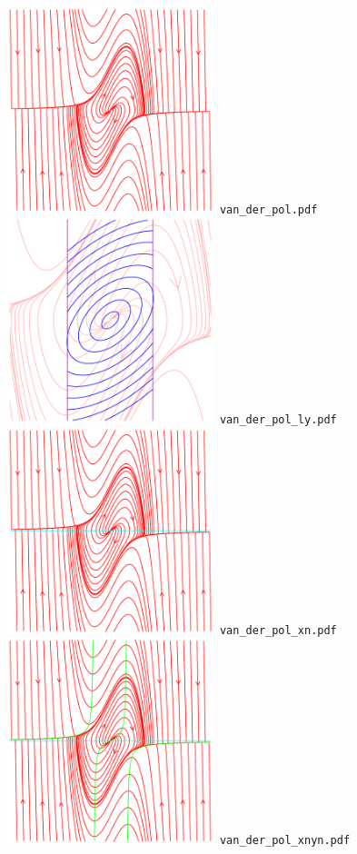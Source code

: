 \documentclass[a4paper]{amsart}
\begin{document}
\includegraphics[width=6cm]{van_der_pol.pdf}\verb+ van_der_pol.pdf+\\
\includegraphics[width=6cm]{van_der_pol_ly.pdf}\verb+ van_der_pol_ly.pdf+\\
\includegraphics[width=6cm]{van_der_pol_xn.pdf}\verb+ van_der_pol_xn.pdf+\\
\includegraphics[width=6cm]{van_der_pol_xnyn.pdf}\verb+ van_der_pol_xnyn.pdf+\\
\end{document}
